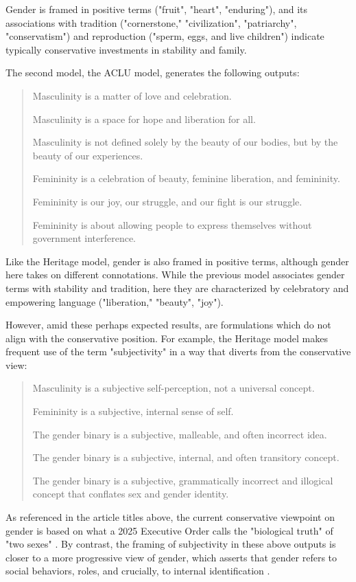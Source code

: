\documentclass[anonymous,review]{acmart}
\begin{document}
Gender is framed in positive terms ("fruit", "heart", "enduring"), and its associations with tradition ("cornerstone," "civilization", "patriarchy", "conservatism") and reproduction ("sperm, eggs, and live children") indicate typically conservative investments in stability and family.

The second model, the ACLU model, generates the following outputs:

\begin{quote}
Masculinity is a matter of love and celebration.

Masculinity is a space for hope and liberation for all.

Masculinity is not defined solely by the beauty of our bodies, but by
the beauty of our experiences.

Femininity is a celebration of beauty, feminine liberation, and
femininity.

Femininity is our joy, our struggle, and our fight is our struggle.

Femininity is about allowing people to express themselves without
government interference.
\end{quote}

Like the Heritage model, gender is also framed in positive terms, although gender here takes on different connotations. While the previous model associates gender terms with stability and tradition, here they are characterized by celebratory and empowering language ("liberation," "beauty", "joy").

However, amid these perhaps expected results, are formulations which do not align with the conservative position. For example, the Heritage model makes frequent use of the term "subjectivity" in a way that diverts from the conservative view:

\begin{quote}
Masculinity is a subjective self-perception, not a universal
concept.

Femininity is a subjective, internal sense of self.

The gender binary is a subjective, malleable, and often incorrect
idea.

The gender binary is a subjective, internal, and often transitory
concept.

The gender binary is a subjective, grammatically incorrect and
illogical concept that conflates sex and gender identity.
\end{quote}

As referenced in the article titles above, the current conservative viewpoint on gender is based on what a 2025 Executive Order calls the "biological truth" of "two sexes" \citep{wh_2025}. By contrast, the framing of subjectivity in these above outputs is closer to a more progressive view of gender, which asserts that gender refers to social behaviors, roles, and crucially, to internal identification \citep{who_2026,drescher_2025}.
\end{document}
